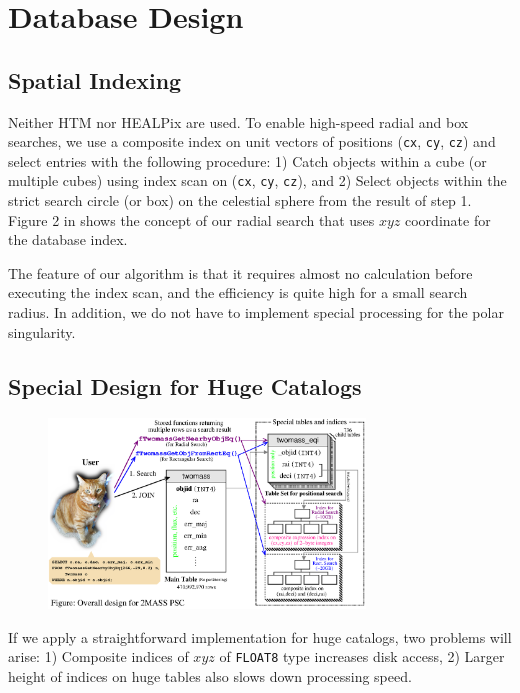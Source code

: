 \section{Database Design}

\subsection{Spatial Indexing}

Neither HTM \citep{kun_2000} nor HEALPix \citep{gor_2005} are used. To enable high-speed radial and box searches, we use a composite index on unit vectors of positions ({\tt cx}, {\tt cy}, {\tt cz}) and select entries with the following procedure: 1) Catch objects within a cube (or multiple cubes) using index scan on ({\tt cx}, {\tt cy}, {\tt cz}), and 2) Select objects within the strict search circle (or box) on the celestial sphere from the result of step 1. Figure 2 in \citet{yam_2011a} shows the concept of our radial search that uses $x$$y$$z$ coordinate for the database index.

The feature of our algorithm is that it requires almost no calculation before executing the index scan, and the efficiency is quite high for a small search radius. In addition, we do not have to implement special processing for the polar singularity.

\subsection{Special Design for Huge Catalogs}

\begin{figure}[t]
\centering
\includegraphics[width=0.75\textwidth]{part10/Yamauchi_P35/db_design.eps}
\end{figure}

If we apply a straightforward implementation for huge catalogs, two problems will arise: 1) Composite indices of $x$$y$$z$ of {\tt FLOAT8} type increases disk access, 2) Larger height of indices on huge tables also slows down processing speed.

